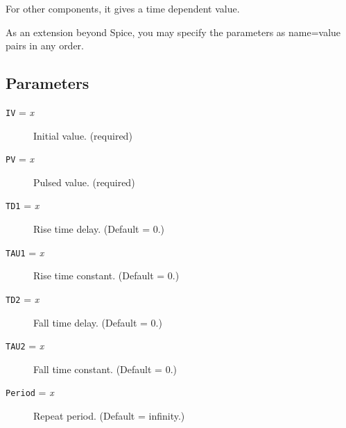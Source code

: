 For other components, it gives a time dependent value.

As an extension beyond Spice, you may specify the parameters as
name=value pairs in any order.
\subsection{Parameters}

\begin{description}

\item[{\tt IV} = {\it x}] Initial value.  (required)

\item[{\tt PV} = {\it x}] Pulsed value.  (required)

\item[{\tt TD1} = {\it x}] Rise time delay.  (Default = 0.)

\item[{\tt TAU1} = {\it x}] Rise time constant.  (Default = 0.)

\item[{\tt TD2} = {\it x}] Fall time delay.  (Default = 0.)

\item[{\tt TAU2} = {\it x}] Fall time constant.  (Default = 0.)

\item[{\tt Period} = {\it x}] Repeat period.  (Default = infinity.)

\end{description}
